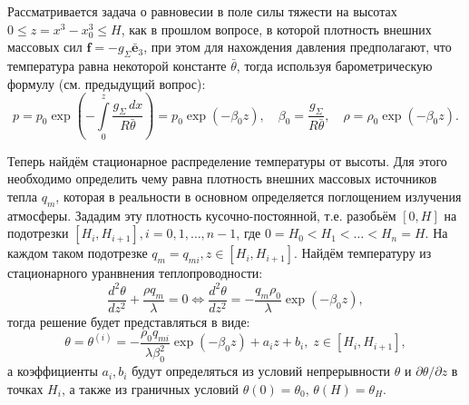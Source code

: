 
Рассматривается задача о равновесии в поле силы тяжести на высотах
$0 \leqslant z = x^3 - x_0^3 \leqslant H$, как в прошлом вопросе,
в которой плотность внешних массовых сил $\mathbf{f} = - g_\Sigma \bar{\mathbf{e}}_3$,
при этом для нахождения давления предполагают, что температура равна некоторой константе
$\bar{\theta}$, тогда используя барометрическую формулу (см. предыдущий вопрос):
\[
  p = p_0 \exp \left( - \int\limits_0^z \dfrac{g_\Sigma \, dx}{R \bar{\theta}} \right) =
  p_0 \exp \left( - \beta_0 z \right), \quad \beta_0 = \dfrac{g_\Sigma}{R\bar{\theta}}, \quad
  \rho = \rho_0 \exp \left( - \beta_0 z \right).
\]

Теперь найдём стационарное распределение температуры от высоты. Для этого необходимо
определить чему равна плотность внешних массовых источников тепла $q_m$, которая
в реальности в основном определяется поглощением излучения атмосферы. 
Зададим эту плотность кусочно-постоянной, т.е. разобьём $[0, H]$ на подотрезки
$[H_i, H_{i+1}], i = 0, 1, \dots, n-1$, где $0 = H_0 < H_1 < \dots < H_n = H$.
На каждом таком подотрезке $q_m = q_{mi}, z \in [H_i, H_{i+1}]$. Найдём температуру из 
стационарного уранвнения теплопроводности:
\[
  \dfrac{d^2\theta}{dz^2} + \dfrac{\rho q_m}{\lambda} = 0
  \Leftrightarrow
  \dfrac{d^2 \theta}{dz^2} = - \dfrac{q_m \rho_0}{\lambda} \exp \left( - \beta_0 z \right),
\]
тогда решение будет представляться в виде:
\[
  \theta = \theta^{(i)} = - \dfrac{\rho_0 q_{mi}}{\lambda \beta_0^2} \exp \left( - \beta_0 z \right) + a_i z + b_i, \; z \in [H_i, H_{i+1}],
\]
а коэффициенты $a_i, b_i$ будут определяться из условий непрерывности $\theta$ и
$\partial \theta / \partial z$ в точках $H_i$, а также из граничных условий $\theta(0) = \theta_0$,
$\theta(H) = \theta_H$.
